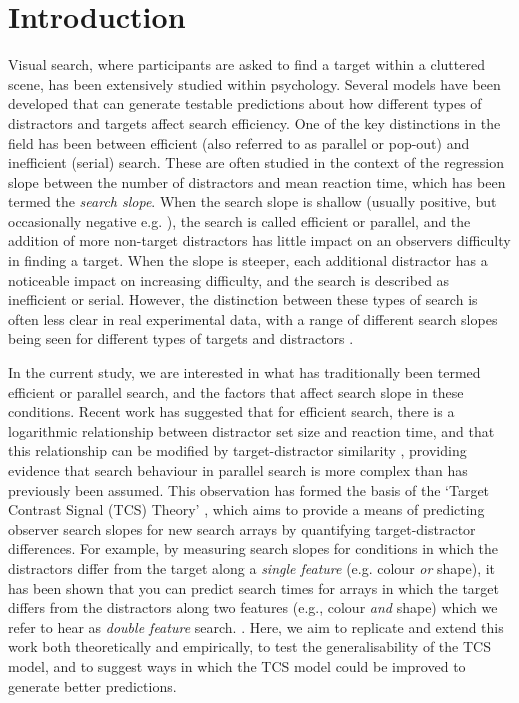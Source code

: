 \documentclass[preprint,12pt,authoryear]{elsarticle}
\begin{document}
\section{Introduction}
\label{intro}

Visual search, where participants are asked to find a target within a cluttered scene, has been extensively studied within psychology. Several models have been developed that can generate testable predictions about how different types of distractors and targets affect search efficiency. One of the key distinctions in the field has been between efficient (also referred to as parallel or pop-out) and inefficient (serial) search. These are often studied in the context of the regression slope between the number of distractors and mean reaction time, which has been termed the \textit{search slope}. When the search slope is shallow (usually positive, but occasionally negative e.g. \cite{rangelov2017}), the search is called efficient or parallel, and the addition of more non-target distractors has little impact on an observers difficulty in finding a target. When the slope is steeper, each additional distractor has a noticeable impact on increasing difficulty, and the search is described as inefficient or serial. However, the distinction between these types of search is often less clear in real experimental data, with a range of different search slopes being seen for different types of targets and distractors \citep{cave1990modeling}.

In the current study, we are interested in what has traditionally been termed efficient or parallel search, and the factors that affect search slope in these conditions. Recent work has suggested that for efficient search, there is a logarithmic relationship between distractor set size and reaction time, and that this relationship can be modified by target-distractor similarity \citep{buetti2016towards}, providing evidence that search behaviour in parallel search is more complex than has previously been assumed. This observation has formed the basis of the `Target Contrast Signal (TCS) Theory' \citep{lleras2020target}, which aims to provide a means of predicting observer search slopes for new search arrays by quantifying target-distractor differences. For example, by measuring search slopes for conditions in which the distractors differ from the target along a \textit{single feature} (e.g. colour \textit{or} shape), it has been shown that you can predict search times for arrays in which the target differs from the distractors along two features (e.g., colour \textit{and} shape) which we refer to hear as \textit{double feature} search. \citep{buetti2019predicting}. Here, we aim to replicate and extend this work both theoretically and empirically, to test the generalisability of the TCS model, and to suggest ways in which the TCS model could be improved to generate better predictions.
\end{document}
